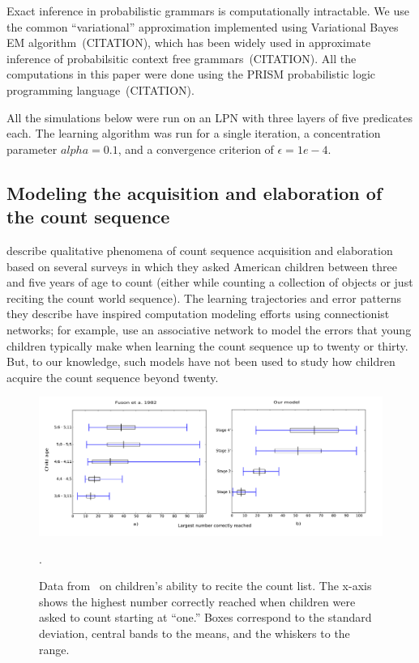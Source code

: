 \documentclass[10pt,letterpaper]{article}
\begin{document}
Exact inference in probabilistic grammars is computationally
intractable. We use the common ``variational'' approximation
implemented using Variational Bayes EM algorithm~(CITATION), which has
been widely used in approximate inference of probabilsitic context
free grammars~(CITATION). All the computations in this paper were done
using the PRISM probabilistic logic programming language~(CITATION).

All the simulations below were run on an LPN with three layers of five
predicates each. The learning algorithm was run for a single
iteration, a concentration parameter $alpha=0.1$, and a convergence
criterion of $\epsilon=1e-4$.

\subsection{Modeling the acquisition and elaboration of the count sequence}

\citet{FusRicBriar1982} describe qualitative phenomena of
count sequence acquisition and elaboration based on several surveys in
which they asked American children between three and five years of age
to count (either while counting a collection of objects or just
reciting the count world sequence). The learning trajectories and
error patterns they describe have inspired computation modeling
efforts using connectionist networks; for example,
\citet{ma1989modeling} use an associative network to model the errors
that young children typically make when learning the count sequence up
to twenty or thirty. But, to our knowledge, such models have not been
used to study how children acquire the count sequence beyond twenty.


\begin{figure}[t]
\includegraphics[width=0.9\linewidth]{figures/modelboxplot}
\caption{Data from~\citet{FusRicBriar1982} on children's ability to
  recite the count list. The x-axis shows the highest number correctly
  reached when children were asked to count starting at ``one.'' Boxes
  correspond to the standard deviation, central bands to the means,
  and the whiskers to the range.
\label{fig:fuson_count_data}}. 
\end{figure}
\end{document}
